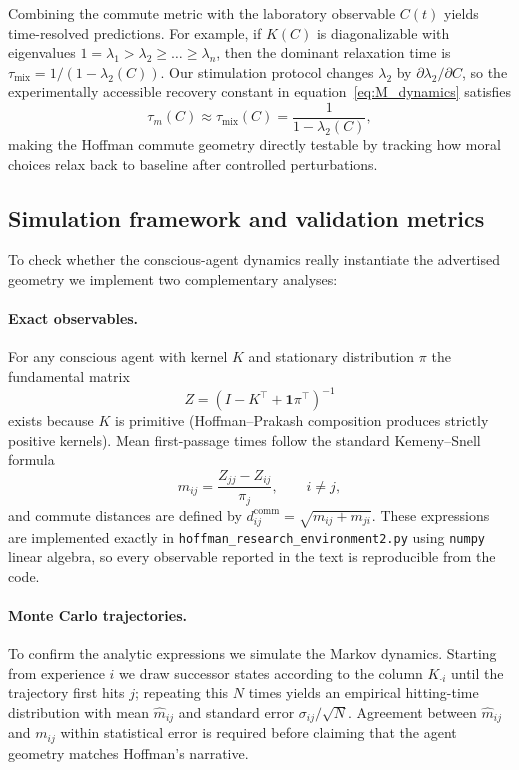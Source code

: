 \documentclass[12pt,a4paper]{article}
\theoremstyle{definition}
\begin{document}
Combining the commute metric with the laboratory observable $C(t)$ yields time-resolved predictions. For example, if $K(C)$ is diagonalizable with eigenvalues $1 = \lambda_1 > \lambda_2 \ge \dots \ge \lambda_n$, then the dominant relaxation time is $\tau_{\text{mix}} = 1/(1 - \lambda_2(C))$. Our stimulation protocol changes $\lambda_2$ by $\partial \lambda_2 / \partial C$, so the experimentally accessible recovery constant in equation~\eqref{eq:M_dynamics} satisfies
\begin{equation}
\tau_m(C) \approx \tau_{\text{mix}}(C) = \frac{1}{1 - \lambda_2(C)},
\end{equation}
making the Hoffman commute geometry directly testable by tracking how moral choices relax back to baseline after controlled perturbations.

\subsection{Simulation framework and validation metrics}

To check whether the conscious-agent dynamics really instantiate the advertised geometry we implement two complementary analyses:

\paragraph{Exact observables.} For any conscious agent with kernel $K$ and stationary distribution $\pi$ the fundamental matrix
\begin{equation}
Z = \left(I - K^\top + \mathbf{1} \pi^\top \right)^{-1}
\end{equation}
exists because $K$ is primitive (Hoffman--Prakash composition produces strictly positive kernels). Mean first-passage times follow the standard Kemeny--Snell formula
\begin{equation}
m_{i j} = \frac{Z_{j j} - Z_{i j}}{\pi_j}, \qquad i \neq j,
\end{equation}
and commute distances are defined by $d_{i j}^{\mathrm{comm}} = \sqrt{m_{i j} + m_{j i}}$. These expressions are implemented exactly in \texttt{hoffman\_research\_environment2.py} using \texttt{numpy} linear algebra, so every observable reported in the text is reproducible from the code.

\paragraph{Monte Carlo trajectories.} To confirm the analytic expressions we simulate the Markov dynamics. Starting from experience $i$ we draw successor states according to the column $K_{\cdot i}$ until the trajectory first hits $j$; repeating this $N$ times yields an empirical hitting-time distribution with mean $\hat{m}_{i j}$ and standard error $\sigma_{i j}/\sqrt{N}$. Agreement between $\hat{m}_{i j}$ and $m_{i j}$ within statistical error is required before claiming that the agent geometry matches Hoffman's narrative.
\end{document}
